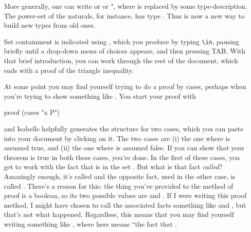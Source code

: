 More generally, one can write  or  or 
", where  is replaced by some type-description. The power-set of the naturals, for instance, has type . Thus  is now a new way to build new types from old ones. 

Set containment is indicated using , which you produce by typing \verb!\in!, pausing briefly until a drop-down menu of choices appears, and then pressing TAB. 
With that brief introduction, you can work through the rest of the document, which ends with a proof of the triangle inequality. 

At some point you may find yourself trying to do a proof by cases, perhaps when you're trying to show something like . You start your proof with 
\begin{IS}
    proof (cases "x \in P")
\end{IS}
and Isabelle helpfully generates the structure for two cases, which you can paste into your document by clicking on it. The two cases are (i) the one where  is assumed true, and (ii) the one where  is assumed false. If you can show that your theorem is true in both these cases, you're done. In the first of these cases, you get to work with the fact that  is in the set .  But what is that fact \textit{called}? Amazingly enough, it's called  and the opposite fact, used in the other case, is called . There's a reason for this: the thing you've provided to the  method of proof is a boolean, so its two possible values are  and . If I were writing this proof method, I might have chosen to call the associated facts something like  and , but that's not what happened. Regardless, this means that you may find yourself writing something like 
, where  here means ``the fact that .


